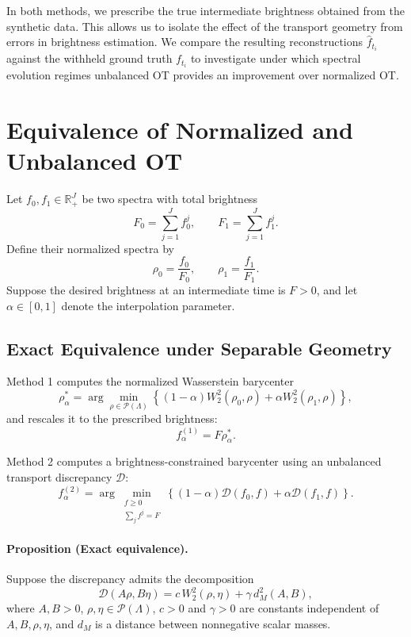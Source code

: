 \documentclass{article}
\begin{document}
In both methods, we prescribe the true intermediate brightness obtained from the synthetic data. This allows us to isolate the effect of the transport geometry from errors in brightness estimation. We compare the resulting reconstructions $\hat f_{t_i}$ against the withheld ground truth $f_{t_i}$ to investigate under which spectral evolution regimes unbalanced OT provides an improvement over normalized OT.

\newpage
\appendix

\section{Equivalence of Normalized and Unbalanced OT}
\label{app:equivalence}

Let $f_0,f_1\in\mathbb{R}_+^J$ be two spectra with
total brightness
\[
F_0=\sum_{j=1}^J f_0^j,
\qquad
F_1=\sum_{j=1}^J f_1^j.
\]
Define their normalized spectra by
\[
\rho_0=\frac{f_0}{F_0},
\qquad
\rho_1=\frac{f_1}{F_1}.
\]
Suppose the desired brightness at an intermediate time is
$F>0$, and let $\alpha\in[0,1]$ denote the interpolation
parameter.

\subsection{Exact Equivalence under Separable Geometry}

Method 1 computes the normalized Wasserstein barycenter
\begin{equation}
\rho_\alpha^*
=
\arg\min_{\rho\in\mathcal P(\Lambda)}
\left\{
(1-\alpha)W_2^2(\rho_0,\rho)
+
\alpha W_2^2(\rho_1,\rho)
\right\},
\end{equation}
and rescales it to the prescribed brightness:
\begin{equation}
f_\alpha^{(1)}=F\rho_\alpha^*.
\end{equation}

Method 2 computes a brightness-constrained barycenter
using an unbalanced transport discrepancy $\mathcal D$:
\begin{equation}
f_\alpha^{(2)}
=
\arg\min_{\substack{f\geq 0\\ \sum_j f^j=F}}
\left\{
(1-\alpha)\mathcal D(f_0,f)
+
\alpha\mathcal D(f_1,f)
\right\}.
\end{equation}

\paragraph{Proposition (Exact equivalence).}
Suppose the discrepancy admits the decomposition
\begin{equation}
\boxed{
\mathcal D(A\rho,B\eta)
=
c\,W_2^2(\rho,\eta)
+
\gamma\,d_M^2(A,B),
}
\end{equation}
where $A,B>0$, $\rho,\eta\in\mathcal P(\Lambda)$,
$c>0$ and $\gamma>0$ are constants independent of
$A,B,\rho,\eta$, and $d_M$ is a distance between
nonnegative scalar masses.
\end{document}
